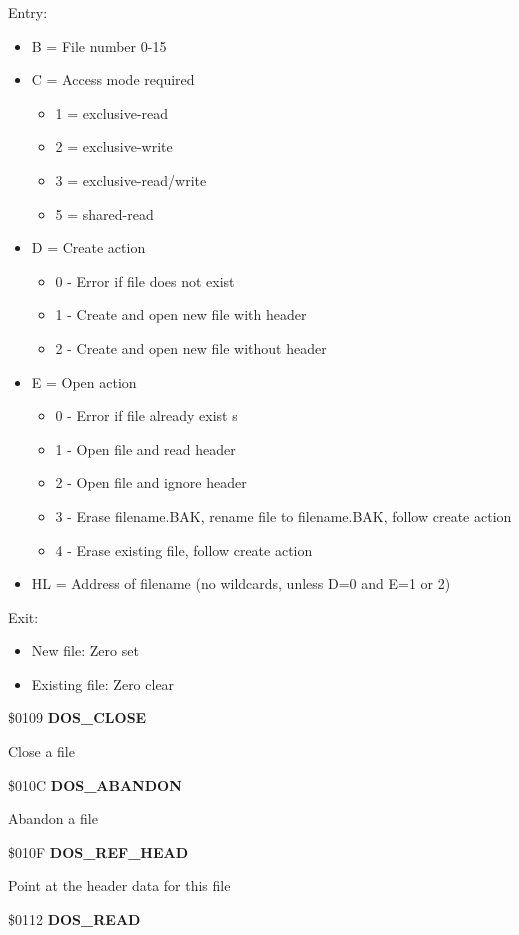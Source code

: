 Entry:
\begin{itemize}
\item[] B = File number 0-15
\item[] C = Access mode required
  \begin{itemize}
  \item[] 1 = exclusive-read
  \item[] 2 = exclusive-write
  \item[] 3 = exclusive-read/write
  \item[] 5 = shared-read
  \end{itemize}
\item[] D = Create action
  \begin{itemize}
  \item[] 0 - Error if file does not exist  
  \item[] 1 - Create and open new file with header
  \item[] 2 - Create and open new file without header
  \end{itemize}
\item[] E = Open action
  \begin{itemize}
  \item[] 0 - Error if file already exist  s
  \item[] 1 - Open file and read header
  \item[] 2 - Open file and ignore header
  \item[] 3 - Erase filename.BAK, rename file to filename.BAK, follow
    create action
  \item[] 4 - Erase existing file, follow create action
  \end{itemize}
\item[] HL = Address of filename (no wildcards, unless D=0 and E=1 or 2)
\end{itemize}
Exit:
\begin{itemize}
\item[] New file: Zero set
\item[] Existing file: Zero clear
\end{itemize}

\$0109 \textbf{DOS\_CLOSE}

Close a file

\$010C \textbf{DOS\_ABANDON}

Abandon a file

\$010F \textbf{DOS\_REF\_HEAD}

Point at the header data for this file

\$0112 \textbf{DOS\_READ}

